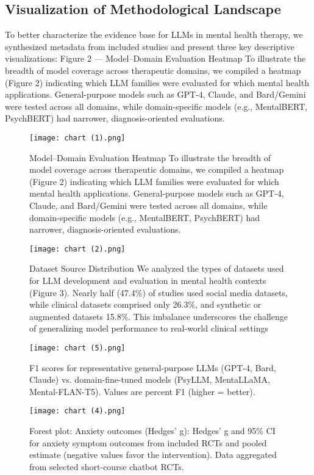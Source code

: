 \documentclass[journal]{IEEEtran}
\begin{document}
\subsection{Visualization of Methodological Landscape}
To better characterize the evidence base for LLMs in mental health therapy, we synthesized metadata from included studies and present three key descriptive visualizations:
Figure 2 — Model–Domain Evaluation Heatmap
 To illustrate the breadth of model coverage across therapeutic domains, we compiled a heatmap (Figure 2) indicating which LLM families were evaluated for which mental health applications. General-purpose models such as GPT-4, Claude, and Bard/Gemini were tested across all domains, while domain-specific models (e.g., MentalBERT, PsychBERT) had narrower, diagnosis-oriented evaluations.
\begin{figure}
    \centering
    \texttt{[image: chart (1).png]}
    \caption{Model–Domain Evaluation Heatmap
 To illustrate the breadth of model coverage across therapeutic domains, we compiled a heatmap (Figure 2) indicating which LLM families were evaluated for which mental health applications. General-purpose models such as GPT-4, Claude, and Bard/Gemini were tested across all domains, while domain-specific models (e.g., MentalBERT, PsychBERT) had narrower, diagnosis-oriented evaluations.}
    \label{fig:metric_frequency}
\end{figure}
\begin{figure}
    \centering
    \texttt{[image: chart (2).png]}
    \caption{Dataset Source Distribution
 We analyzed the types of datasets used for LLM development and evaluation in mental health contexts (Figure 3). Nearly half (47.4\%) of studies used social media datasets, while clinical datasets comprised only 26.3\%, and synthetic or augmented datasets 15.8\%. This imbalance underscores the challenge of generalizing model performance to real-world clinical settings
}
    \label{fig:placeholder}
\end{figure}
\begin{figure}
    \centering
    \texttt{[image: chart (5).png]}
    \caption{F1 scores for representative general-purpose LLMs (GPT-4, Bard, Claude) vs. domain-fine-tuned models (PsyLLM, MentaLLaMA, Mental-FLAN-T5). Values are percent F1 (higher = better).}
    \label{fig:model_performance_chart}
\end{figure}
\begin{figure}
    \centering
    \texttt{[image: chart (4).png]}
    \caption{Forest plot: Anxiety outcomes (Hedges’ g): Hedges’ g and 95\% CI for anxiety symptom outcomes from included RCTs and pooled estimate (negative values favor the intervention). Data aggregated from selected short-course chatbot RCTs.}
    \label{fig:forestplot_depression}
\end{figure}
\end{document}
